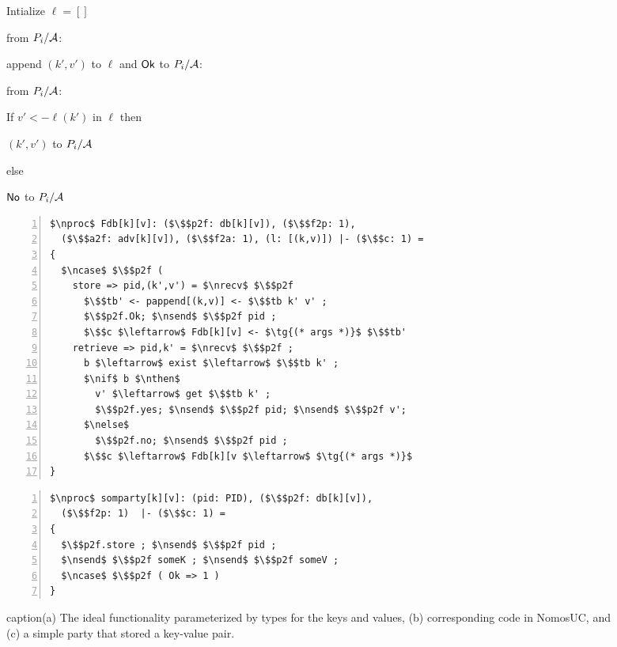 \begin{figure}
\centering
\begin{minipage}{0.38\textwidth}
\begin{bbox}[title={Functionality $\F_{\m{db}}$}]

Intialize $\ell = []$

\OnInput {} from $P_i/\mathcal{A}$:

\qquad append $(k',v')$ to $\ell$ and \Send $\mathsf{Ok}$ to $P_i/\mathcal{A}$:

\OnInput {} from $P_i/\mathcal{A}$:

\qquad If $v' <- \ell(k')$ in $\ell$ then

\qquad \qquad \Send $(k', v')$ to $P_i/\mathcal{A}$

\qquad else

\qquad \qquad \Send $\mathsf{No}$ to $P_i/\mathcal{A}$
\end{bbox}
\end{minipage}
\hspace{3em}
\begin{minipage}{0.5\textwidth}
\begin{lstlisting}[basicstyle=\scriptsize\BeraMonottFamily, frame=single, mathescape, numbers=left, xleftmargin=2em, xrightmargin=2em]
$\nproc$ Fdb[k][v]: ($\$$p2f: db[k][v]), ($\$$f2p: 1), 
  ($\$$a2f: adv[k][v]), ($\$$f2a: 1), (l: [(k,v)]) |- ($\$$c: 1) =
{
  $\ncase$ $\$$p2f (
    store => pid,(k',v') = $\nrecv$ $\$$p2f
      $\$$tb' <- pappend[(k,v)] <- $\$$tb k' v' ;
      $\$$p2f.Ok; $\nsend$ $\$$p2f pid ;
	  $\$$c $\leftarrow$ Fdb[k][v] <- $\tg{(* args *)}$ $\$$tb'
    retrieve => pid,k' = $\nrecv$ $\$$p2f ;
      b $\leftarrow$ exist $\leftarrow$ $\$$tb k' ;
      $\nif$ b $\nthen$
        v' $\leftarrow$ get $\$$tb k' ;
        $\$$p2f.yes; $\nsend$ $\$$p2f pid; $\nsend$ $\$$p2f v';
      $\nelse$
        $\$$p2f.no; $\nsend$ $\$$p2f pid ;
      $\$$c $\leftarrow$ Fdb[k][v $\leftarrow$ $\tg{(* args *)}$ 
}
\end{lstlisting}
\end{minipage}
\hspace{3em}
\begin{minipage}{0.5\textwidth}
\begin{lstlisting}[basicstyle=\scriptsize\BeraMonottFamily, frame=single, mathescape, numbers=left, xleftmargin=2em, xrightmargin=2em]
$\nproc$ somparty[k][v]: (pid: PID), ($\$$p2f: db[k][v]), 
  ($\$$f2p: 1)  |- ($\$$c: 1) =
{
  $\$$p2f.store ; $\nsend$ $\$$p2f pid ; 
  $\nsend$ $\$$p2f someK ; $\nsend$ $\$$p2f someV ;
  $\ncase$ $\$$p2f ( Ok => 1 )
}
\end{lstlisting}
\end{minipage}
caption{(a) The ideal functionality \Fdb parameterized by types for the keys and values, 
(b) corresponding code in NomosUC, and (c) a simple party that stored a key-value pair.}
\label{fig:fdbideal}
\vspace{-4mm}
\end{figure}
